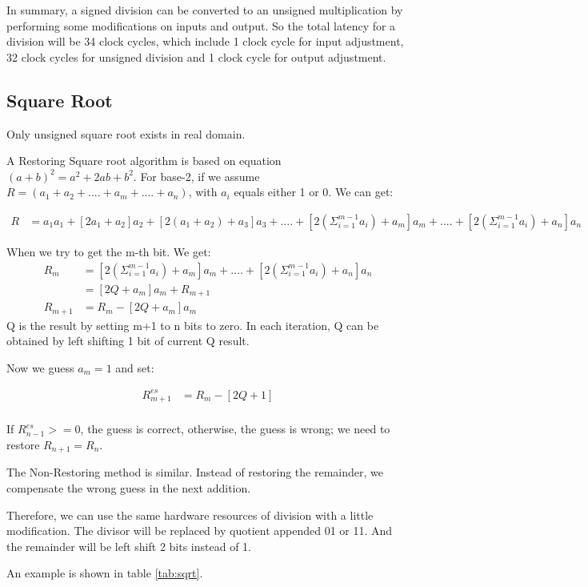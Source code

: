 In summary, a signed division can be converted to an unsigned multiplication by
performing some modifications on inputs and output. So the total latency for a division
will be 34 clock cycles, which include 1 clock cycle for input adjustment, 32 clock cycles
for unsigned division and 1 clock cycle for output adjustment.

\subsection[Square Root]{Square Root}
Only unsigned square root exists in real domain.

A Restoring Square root algorithm is based on equation $(a+b)^2=a^2+2ab+b^2$. For base-2, if we assume $R=(a_1+a_2+....+a_m+....+a_n)$, with $a_i$ equals either 1 or 0. We can
get:

\begin{align*}
R &= a_1a_1 + [2a_1+a_2]a_2 + [2(a_1+a_2)+a_3]a_3 + .... + [2(\Sigma_{i=1}^{m-1}a_i)+a_m]a_m + .... + [2(\Sigma_{i=1}^{m-1}a_i)+a_n]a_n
\end{align*}

When we try to get the m-th bit. We get:
\begin{align*}
R_m &= [2(\Sigma_{i=1}^{m-1}a_i)+a_m]a_m + .... + [2(\Sigma_{i=1}^{m-1}a_i)+a_n]a_n\\
	&= [2Q+a_m]a_m + R_{m+1}\\
R_{m+1} &= R_m - [2Q+a_m]a_m
\end{align*}
Q is the result by setting m+1 to n bits to zero. In each iteration, Q can be obtained by
left shifting 1 bit of current Q result.

Now we guess $a_m=1$ and set:

\begin{align*}
R_{m+1}^{es} &= R_m - [2Q+1]\\
\end{align*}

If $R_{n-1}^{es}>=0$, the guess is correct, otherwise, the guess is wrong; we need to
restore $R_{n+1}=R_{n}$.

The Non-Restoring method is similar. Instead of restoring the remainder, we compensate
the wrong guess in the next addition.

Therefore, we can use the same hardware resources of division with a little modification. The divisor
will be replaced by quotient appended 01 or 11. And the remainder will be left shift 2 bits instead of 1.

An example is shown in table \ref{tab:sqrt}.

